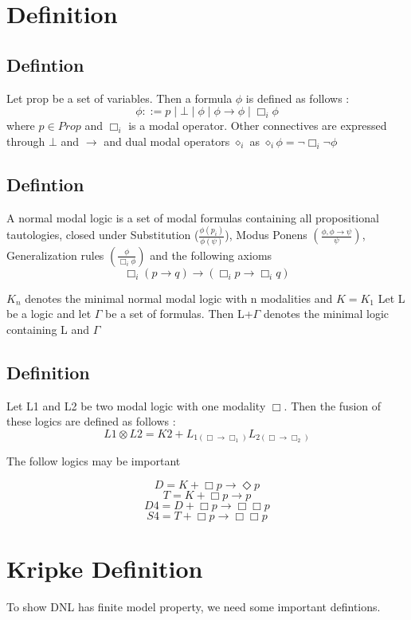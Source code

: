 \documentclass[12pt, a4paper]{scrreprt}
\begin{document}
\chapter{Definition}

\section{Defintion }
Let prop be a set of variables. Then a formula $\phi$ is defined as follows :
$$\phi ::= p \mid \bot \mid \phi \mid \phi \rightarrow \phi \mid \Box_i \phi$$
where $p \in Prop$ and $\Box_i$ is a modal operator. Other connectives are expressed through $\bot$ and $\rightarrow$ and 
dual modal operators $\diamond_i$ as $\diamond_i \phi = \neg \Box_i \neg \phi$

\section{Defintion }
A normal modal logic is a set of modal formulas containing all propositional tautologies,
closed under Substitution ($\frac{\phi(p_i)}{\phi(\psi)}$), Modus Ponens 
$(\frac{\phi, \phi \rightarrow \psi}{\psi})$, Generalization rules $(\frac{\phi}{\Box_i \phi})$
and the following axioms 
$$ \Box_i (p \rightarrow q) \rightarrow (\Box_i p \rightarrow \Box_i q)$$

$K_n$ denotes the minimal normal modal logic with n modalities and $K = K_1$
Let L be a logic and let $\Gamma$ be a set of formulas. Then L+$\Gamma$ denotes 
the minimal logic containing L and $\Gamma$

\section{Definition}
Let L1 and L2 be two modal logic with one modality $\Box$. Then the fusion of these 
logics are defined as follows :
$$ L1 \otimes L2 = K2 + L_{1(\Box \rightarrow \Box_1)} L_{2(\Box \rightarrow \Box_2)} $$

The follow logics may be important 

$$D = K + \Box p \rightarrow \Diamond p$$
$$T = K + \Box p \rightarrow p$$
$$D4 = D + \Box p \rightarrow \Box \Box p$$
$$S4 = T + \Box p \rightarrow \Box \Box p$$

\chapter{Kripke Definition}
To show DNL has finite model property, we need some important defintions.
\end{document}
